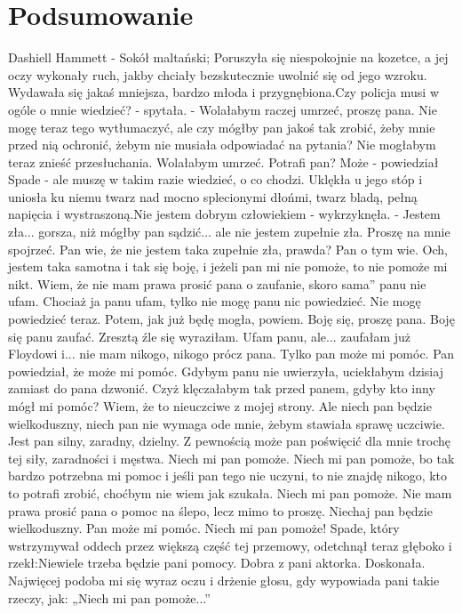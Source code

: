 \newpage

\section{Podsumowanie}

Dashiell Hammett - Sokół maltański; Poruszyła się niespokojnie na kozetce, a jej oczy wykonały ruch, jakby chciały bezskutecznie uwolnić się od jego wzroku. Wydawała się jakaś mniejsza, bardzo młoda i przygnębiona.Czy policja musi w ogóle o mnie wiedzieć? - spytała. - Wolałabym raczej umrzeć, proszę pana. Nie mogę teraz tego wytłumaczyć, ale czy mógłby pan jakoś tak zrobić, żeby mnie przed nią ochronić, żebym nie musiała odpowiadać na pytania? Nie mogłabym teraz znieść przesłuchania. Wolałabym umrzeć. Potrafi pan? Może - powiedział Spade - ale muszę w takim razie wiedzieć, o co chodzi. Uklękła u jego stóp i uniosła ku niemu twarz nad mocno splecionymi dłońmi, twarz bladą, pełną napięcia i wystraszoną.Nie jestem dobrym człowiekiem - wykrzyknęła. - Jestem zła... gorsza, niż mógłby pan sądzić... ale nie jestem zupełnie zła. Proszę na mnie spojrzeć. Pan wie, że nie jestem taka zupełnie zła, prawda? Pan o tym wie. Och, jestem taka samotna i tak się boję, i jeżeli pan mi nie pomoże, to nie pomoże mi nikt. Wiem, że nie mam prawa prosić pana o zaufanie, skoro sama” panu nie ufam. Chociaż ja panu ufam, tylko nie mogę panu nic powiedzieć. Nie mogę powiedzieć teraz. Potem, jak już będę mogła, powiem. Boję się, proszę pana. Boję się panu zaufać. Zresztą źle się wyraziłam. Ufam panu, ale... zaufałam już Floydowi i... nie mam nikogo, nikogo prócz pana. Tylko pan może mi pomóc. Pan powiedział, że może mi pomóc. Gdybym panu nie uwierzyła, uciekłabym dzisiaj zamiast do pana dzwonić. Czyż klęczałabym tak przed panem, gdyby kto inny mógł mi pomóc? Wiem, że to nieuczciwe z mojej strony. Ale niech pan będzie wielkoduszny, niech pan nie wymaga ode mnie, żebym stawiała sprawę uczciwie. Jest pan silny, zaradny, dzielny. Z pewnością może pan poświęcić dla mnie trochę tej siły, zaradności i męstwa. Niech mi pan pomoże. Niech mi pan pomoże, bo tak bardzo potrzebna mi pomoc i jeśli pan tego nie uczyni, to nie znajdę nikogo, kto to potrafi zrobić, choćbym nie wiem jak szukała. Niech mi pan pomoże. Nie mam prawa prosić pana o pomoc na ślepo, lecz mimo to proszę. Niechaj pan będzie wielkoduszny. Pan może mi pomóc. Niech mi pan pomoże! Spade, który wstrzymywał oddech przez większą część tej przemowy, odetchnął teraz głęboko i rzekł:Niewiele trzeba będzie pani pomocy. Dobra z pani aktorka. Doskonała. Najwięcej podoba mi się wyraz oczu i drżenie głosu, gdy wypowiada pani takie rzeczy, jak: „Niech mi pan pomoże...”